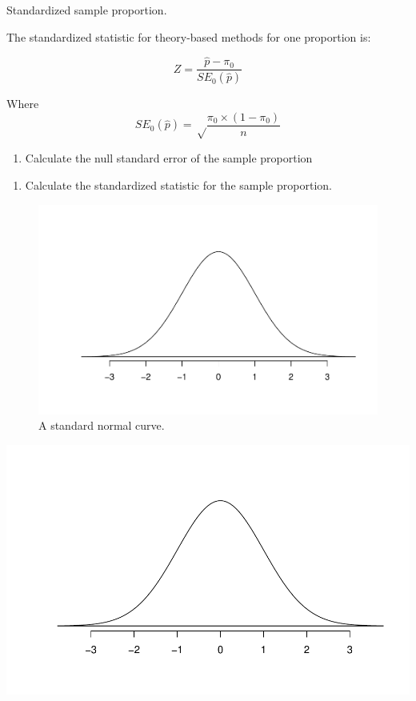 \documentclass[
]{report}
\providecommand{\tightlist}{%
  \setlength{\itemsep}{0pt}\setlength{\parskip}{0pt}}
\begin{document}
\vspace{0.6in}

Standardized sample proportion.

The standardized statistic for theory-based methods for one proportion is:

\[Z = \frac{\hat{p}-\pi_0}{SE_0(\hat{p})}\]

Where \[SE_0(\hat{p})=\sqrt\frac{\pi_0\times (1-\pi_0)}{n}\]

\begin{enumerate}
\def\labelenumi{\arabic{enumi}.}
\setcounter{enumi}{5}
\tightlist
\item
  Calculate the null standard error of the sample proportion
\end{enumerate}

\vspace{0.6in}

\begin{enumerate}
\def\labelenumi{\arabic{enumi}.}
\setcounter{enumi}{6}
\tightlist
\item
  Calculate the standardized statistic for the sample proportion.
\end{enumerate}

\vspace{0.4in}

\begin{figure}

{\centering \includegraphics[width=0.5\linewidth]{05-UR-module4_review_files/figure-latex/simpleNormalcurve-1} 

}

\caption{A standard normal curve.}\label{fig:simpleNormalcurve}
\end{figure}

\begin{center}\includegraphics[width=0.5\linewidth]{05-UR-module4_review_files/figure-latex/Normcurve-1} \end{center}
\end{document}
